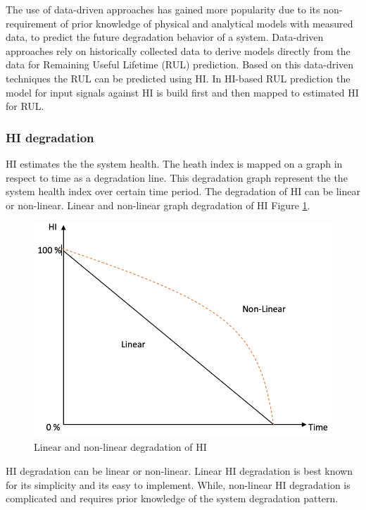 The use of data-driven approaches has gained more popularity due to its non-requirement of prior knowledge of physical
and analytical models with measured data, to predict the future degradation behavior of a system. Data-driven approaches
rely on historically collected data to derive models directly from the data for Remaining Useful Lifetime (RUL) prediction.
Based on this data-driven techniques the RUL can be predicted using HI. In HI-based RUL prediction the model for input
signals against HI is build first and then mapped to estimated HI for RUL.

\subsubsection{HI degradation}

HI estimates the the system health. The heath index is mapped on a graph in respect to time as a degradation line. This
degradation graph represent the the system health index over certain time period. The degradation of HI can be linear or
non-linear. Linear and non-linear graph degradation of HI Figure \ref{fig:HI_Degradation}.

\begin{figure}[ht]
    \centering
    \includegraphics[width=\textwidth]{gfx/HI_Degradation}
    \captionsetup{justification=centering}
    \caption{Linear and non-linear degradation of HI}
    \label{fig:HI_Degradation}
\end{figure}


HI degradation can be linear or non-linear. Linear HI degradation is best known for its simplicity and its easy to
implement. While, non-linear HI degradation is complicated and requires prior knowledge of the system degradation pattern.

